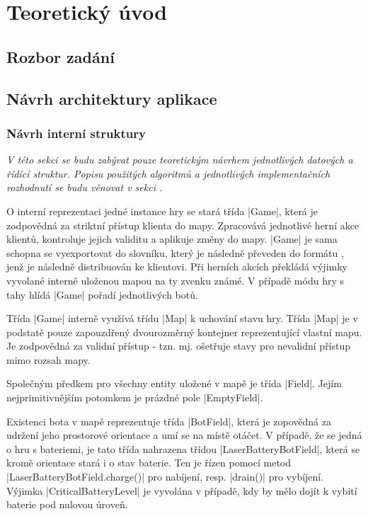 
\section{Teoretický úvod}

\subsection{Rozbor zadání}
\subsection{Návrh architektury aplikace}

\subsubsection{Návrh interní struktury}

\textit{
	V této sekci se budu zabývat pouze teoretickým návrhem jednotlivých datových a řídící struktur. Popisu použitých algoritmů a jednotlivých implementačních rozhodnutí se budu věnovat v sekci .
}

O interní reprezentaci jedné instance hry se stará třída \ic|Game|, která je zodpovědná za striktní přístup klienta do mapy. Zpracovává jednotlivé herní akce klientů, kontroluje jejich validitu a aplikuje změny do mapy. \ic|Game| je sama schopna se vyexportovat do slovníku, který je následně převeden do formátu , jenž je následně distribuován ke klientovi. Při herních akcích překládá výjimky vyvolané interně uloženou mapou na ty zvenku známé. V případě módu hry s tahy hlídá \ic|Game| pořadí jednotlivých botů.

Třída \ic|Game| interně využívá třídu \ic|Map| k uchování stavu hry. Třída \ic|Map| je v podstatě pouze zapouzdřený dvourozměrný kontejner reprezentující vlastní mapu. Je zodpovědná za validní přístup - tzn. mj. ošetřuje stavy pro nevalidní přístup mimo rozsah mapy.

Společným předkem pro všechny entity uložené v mapě je třída \ic|Field|. Jejím nejprimitivnějším potomkem je prázdné pole \ic|EmptyField|.

Existenci bota v mapě reprezentuje třída \ic|BotField|, která je zopovědná za udržení jeho prostorové orientace a umí se na místě otáčet. V případě, že se jedná o hru s bateriemi, je tato třída nahrazena třídou \ic|LaserBatteryBotField|, která se kromě orientace stará i o stav baterie. Ten je řízen pomocí metod \ic|LaserBatteryBotField.charge()| pro nabíjení, resp. \ic|drain()| pro vybíjení. Výjimka \ic|CriticalBatteryLevel| je vyvolána v případě, kdy by mělo dojít k vybití baterie pod nulovou úrove\v{n}.


